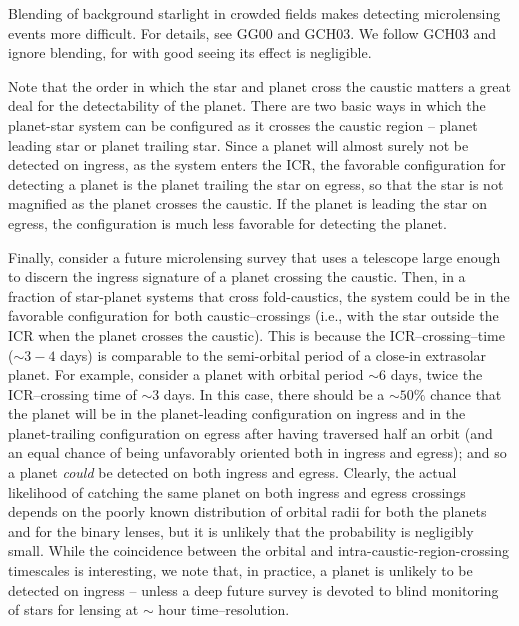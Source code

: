 Blending of background starlight in crowded fields makes detecting
microlensing events more difficult.  For details, see GG00 and GCH03.  We
follow GCH03 and ignore blending, for with good seeing its effect is
negligible.

Note that the order in which the star and planet cross the caustic
matters a great deal for the detectability of the planet.  There are
two basic ways in which the planet-star system can be configured as it
crosses the caustic region -- planet leading star or planet trailing
star.  Since a planet will almost surely not be detected on ingress,
as the system enters the ICR, the favorable configuration for
detecting a planet is the planet trailing the star on egress, so that
the star is not magnified as the planet crosses the caustic.  If the
planet is leading the star on egress, the configuration is much less
favorable for detecting the planet.

Finally, consider a future microlensing survey that uses a telescope
large enough to discern the ingress signature of a planet crossing the
caustic.  Then, in a fraction of star-planet systems that cross
fold-caustics, the system could be in the favorable configuration for
both caustic--crossings (i.e., with the star outside the ICR when the
planet crosses the caustic).  This is because the ICR--crossing--time
($\sim 3-4$ days) is comparable to the semi-orbital period of a
close-in extrasolar planet. For example, consider a planet with
orbital period $\sim 6$ days, twice the ICR--crossing time of $\sim 3$
days.  In this case, there should be a $\sim 50\%$ chance that the
planet will be in the planet-leading configuration on ingress and in
the planet-trailing configuration on egress after having traversed
half an orbit (and an equal chance of being unfavorably oriented both
in ingress and egress); and so a planet \emph{could} be detected on
both ingress and egress.  Clearly, the actual likelihood of catching
the same planet on both ingress and egress crossings depends on the
poorly known distribution of orbital radii for both the planets and
for the binary lenses, but it is unlikely that the probability is
negligibly small.  While the coincidence between the orbital and
intra-caustic-region-crossing timescales is interesting, we note that,
in practice, a planet is unlikely to be detected on ingress -- unless
a deep future survey is devoted to blind monitoring of stars for
lensing at $\sim$ hour time--resolution.



